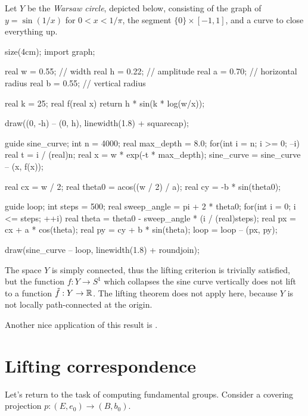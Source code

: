 \begin{remark}
	Let $Y$ be the \textit{Warsaw circle}, depicted below,
	consisting of the graph of $y=\sin(1/x)$ for $0<x<1/\pi$,
	the segment $\{0\}\times[-1,1]$, and a curve to close everything up.
	\begin{center}
		\begin{asy}
			size(4cm);
			import graph;

			real w = 0.55;  // width
			real h = 0.22;  // amplitude
			real a = 0.70;  // horizontal radius
			real b = 0.55;  // vertical radius

			real k = 25;
			real f(real x) {
			    return h * sin(k * log(w/x));
			}

			draw((0, -h) -- (0, h), linewidth(1.8) + squarecap);

			guide sine_curve;
			int n = 4000;
			real max_depth = 8.0;
			for(int i = n; i >= 0; --i) {
			    real t = i / (real)n;
			    real x = w * exp(-t * max_depth);
			    sine_curve = sine_curve -- (x, f(x));
			}

			real cx = w / 2;
			real theta0 = acos((w / 2) / a);
			real cy = -b * sin(theta0);

			guide loop;
			int steps = 500;
			real sweep_angle = pi + 2 * theta0;
			for(int i = 0; i <= steps; ++i) {
    			real theta = theta0 - sweep_angle * (i / (real)steps);
    			real px = cx + a * cos(theta);
    			real py = cy + b * sin(theta);
    			loop = loop -- (px, py);
			}

			draw(sine_curve -- loop, linewidth(1.8) + roundjoin);
		\end{asy}
    \end{center}
    The space $Y$ is simply connected, thus the lifting criterion
	is trivially satisfied, but the function $f:Y\to S^1$ which
	collapses the sine curve vertically does not lift to a function
	$\tilde f:Y\to\mathbb R$. The lifting theorem does not apply here,
	because $Y$ is not locally path-connected at the origin.
\end{remark}
Another nice application of this result is .

\section{Lifting correspondence}
Let's return to the task of computing fundamental groups.
Consider a covering projection $p \colon (E, e_0) \to (B, b_0)$.

